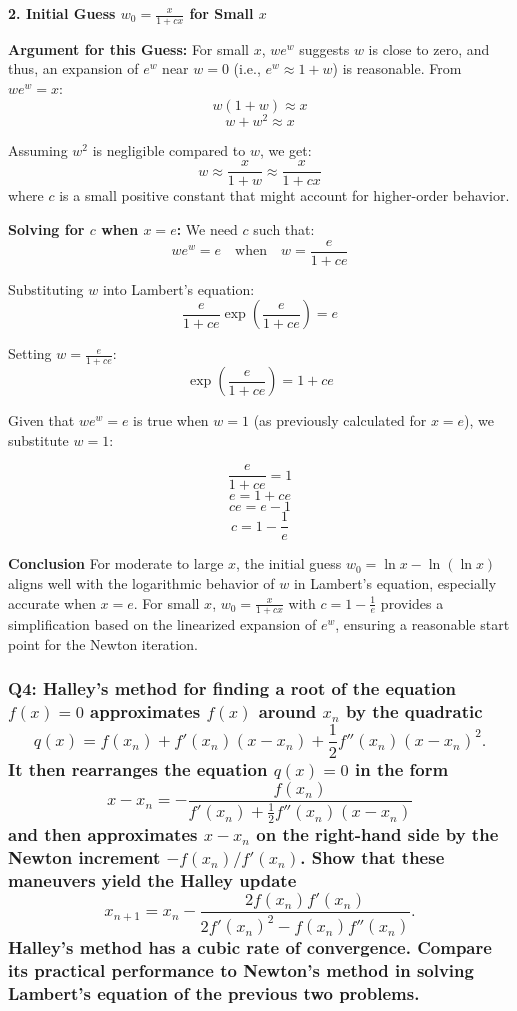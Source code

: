 \documentclass{article}
\begin{document}
\textbf{2. Initial Guess \(w_0 = \frac{x}{1 + cx}\) for Small \(x\)}

\textbf{Argument for this Guess:}
For small \(x\), \(we^w\) suggests \(w\) is close to zero, and thus, an expansion of \(e^w\) near \(w = 0\) (i.e., \(e^w \approx 1 + w\)) is reasonable. From \(we^w = x\):
\[ w(1 + w) \approx x \]
\[ w + w^2 \approx x \]

Assuming \(w^2\) is negligible compared to \(w\), we get:
\[ w \approx \frac{x}{1 + w} \approx \frac{x}{1 + cx} \]
where \(c\) is a small positive constant that might account for higher-order behavior.

\textbf{Solving for \(c\) when \(x = e\):}
We need \(c\) such that:
\[ we^w = e \quad \text{when} \quad w = \frac{e}{1 + ce} \]

Substituting \(w\) into Lambert's equation:
\[ \frac{e}{1 + ce} \exp\left(\frac{e}{1 + ce}\right) = e \]

Setting \(w = \frac{e}{1 + ce}\):
\[ \exp\left(\frac{e}{1 + ce}\right) = 1 + ce \]

Given that \(we^w = e\) is true when \(w = 1\) (as previously calculated for \(x = e\)), we substitute \(w = 1\):

\[ \frac{e}{1 + ce} = 1 \]
\[ e = 1 + ce \]
\[ ce = e - 1 \]
\[ c = 1 - \frac{1}{e} \]

\textbf{Conclusion}
For moderate to large \(x\), the initial guess \(w_0 = \ln x - \ln(\ln x)\) aligns well with the logarithmic behavior of \(w\) in Lambert's equation, especially accurate when \(x = e\). For small \(x\), \(w_0 = \frac{x}{1 + cx}\) with \(c = 1 - \frac{1}{e}\) provides a simplification based on the linearized expansion of \(e^w\), ensuring a reasonable start point for the Newton iteration.

\subsubsection*{Q4: Halley’s method for finding a root of the equation \(f(x) = 0\) approximates \(f(x)\) around \(x_n\) by the quadratic
\[ q(x) = f(x_n) + f'(x_n)(x - x_n) + \frac{1}{2} f''(x_n)(x - x_n)^2. \]
It then rearranges the equation \(q(x) = 0\) in the form
\[ x - x_n = -\frac{f(x_n)}{f'(x_n) + \frac{1}{2} f''(x_n)(x - x_n)} \]
and then approximates \(x - x_n\) on the right-hand side by the Newton increment \(-f(x_n)/f'(x_n)\). Show that these maneuvers yield the Halley update
\[ x_{n+1} = x_n - \frac{2f(x_n)f'(x_n)}{2f'(x_n)^2 - f(x_n)f''(x_n)}. \]
Halley’s method has a cubic rate of convergence. Compare its practical performance to Newton’s method in solving Lambert’s equation of the previous two problems.}
\end{document}
